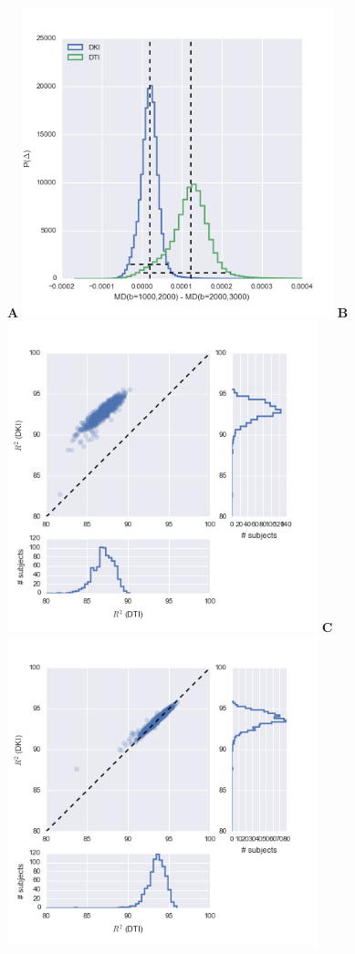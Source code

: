 \documentclass[a0, landscape]{a0poster}
\begin{document}
\begin{multicols}{3}
\begin{minipage}[b]{1\linewidth}
  \large
  \textbf{A}
  \includegraphics[width=9cm]{reliability_singleton_md.png}
  \textbf{B}
  \includegraphics[width=9cm]{dti_dki.png}
  \textbf{C}
  \includegraphics[width=9cm]{dti_1000_dki.png}
\end{minipage}


\end{multicols}
\end{document}
